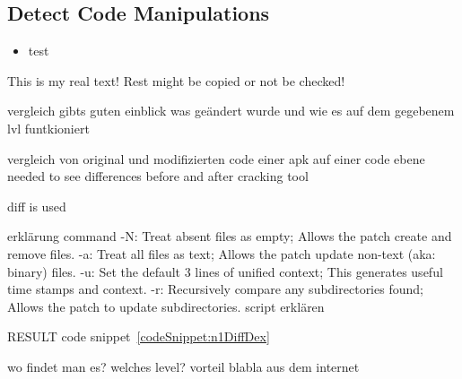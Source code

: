 \subsection{Detect Code Manipulations} \label{subsection:forensics-tools-diff}
\begin{itemize}
    \item test
\end{itemize}
This is my real text! Rest might be copied or not be checked!


vergleich gibts guten einblick was geändert wurde und wie es auf dem gegebenem lvl funtkioniert\newline

vergleich von original und modifizierten code einer apk auf einer code ebene\newline
needed to see differences before and after cracking tool\newline

diff is used\newline




erklärung command \cite{diffUbuntu}
-N: Treat absent files as empty; Allows the patch create and remove files.\newline
-a: Treat all files as text; Allows the patch update non-text (aka: binary) files.\newline
-u: Set the default 3 lines of unified context; This generates useful time stamps and context.\newline
-r: Recursively compare any subdirectories found; Allows the patch to update subdirectories.\newline
script erklären\newline

RESULT code snippet~\ref{codeSnippet:n1DiffDex}

wo findet man es?\newline
welches level?\newline
vorteil\newline
blabla aus dem internet\newline
